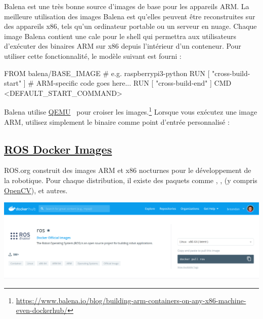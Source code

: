 {Balena est une très bonne source d'images de base pour les appareils ARM. La meilleure utilisation des images Balena est qu'elles peuvent être reconstruites sur des appareils x86, tels qu'un ordinateur portable ou un serveur en nuage. Chaque image Balena contient une cale pour le shell qui permettra aux utilisateurs d'exécuter des binaires ARM sur x86 depuis l'intérieur d'un conteneur. Pour utiliser cette fonctionnalité, le modèle  suivant est fourni :
%
\begin{dockerlisting}
FROM balena/BASE_IMAGE # e.g. raspberrypi3-python
RUN [ "cross-build-start" ]
# ARM-specific code goes here...
RUN [ "cross-build-end" ]
CMD <DEFAULT_START_COMMAND>
\end{dockerlisting}
%
Balena utilise \href{https://www.qemu.org/}{QEMU}~\citep{bellard2005qemu} pour croiser les images.\hspace{-.08em}\footnote{\url{https://www.balena.io/blog/building-arm-containers-on-any-x86-machine-even-dockerhub/}} Lorsque vous exécutez une image ARM, utilisez simplement le binaire  comme point d'entrée personnalisé :
%

\subsection{\href{https://hub.docker.com/_/ros}{ROS Docker Images}}

ROS.org construit des images ARM et x86 nocturnes pour le développement de la robotique. Pour chaque distribution, il existe des paquets comme , ,  (y compris \href{https://opencv.org/}{OpenCV}),  et autres.\vspace{10pt}
%
\begin{centering}
\includegraphics[width=\textwidth]{../figures/ros_docker_images.png}
\end{centering}

}
